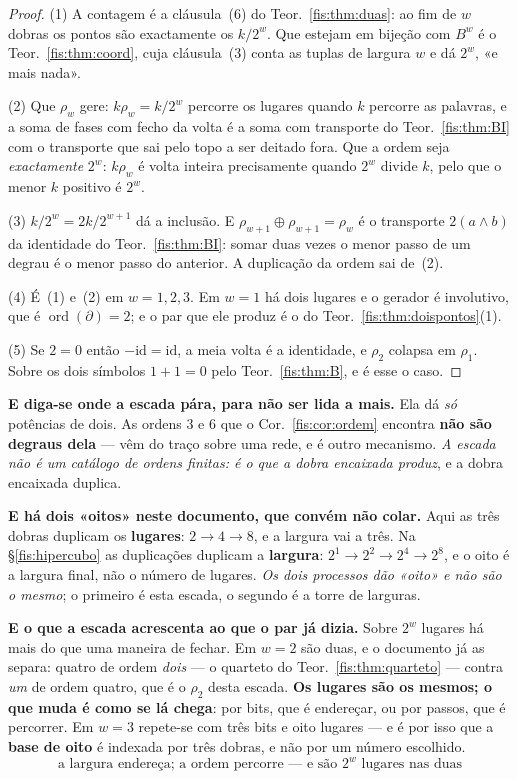 \documentclass[livro.tex]{subfiles}
\begin{document}
\begin{proof}
(1) A contagem é a cláusula~(6) do Teor.~\ref{fis:thm:duas}: ao fim de $w$
dobras os pontos são exactamente os $k/2^{w}$. Que estejam em bijeção com
$B^{w}$ é o Teor.~\ref{fis:thm:coord}, cuja cláusula~(3) conta as tuplas de
largura $w$ e dá $2^{w}$, «e mais nada».

(2) Que $\rho_w$ gere: $k\rho_w=k/2^{w}$ percorre os lugares quando $k$ percorre
as palavras, e a soma de fases com fecho da volta é a soma com transporte do
Teor.~\ref{fis:thm:BI} com o transporte que sai pelo topo a ser deitado fora.
Que a ordem seja \emph{exactamente} $2^{w}$: $k\rho_w$ é volta inteira
precisamente quando $2^{w}$ divide $k$, pelo que o menor $k$ positivo é $2^{w}$.

(3) $k/2^{w}=2k/2^{w+1}$ dá a inclusão. E $\rho_{w+1}\oplus\rho_{w+1}=\rho_w$ é
o transporte $2(a\wedge b)$ da identidade do Teor.~\ref{fis:thm:BI}: somar duas
vezes o menor passo de um degrau é o menor passo do anterior. A duplicação da
ordem sai de~(2).

(4) É~(1) e~(2) em $w=1,2,3$. Em $w=1$ há dois lugares e o gerador é involutivo,
que é $\operatorname{ord}(\partial)=2$; e o par que ele produz é o do
Teor.~\ref{fis:thm:doispontos}(1).

(5) Se $2=0$ então $-\mathrm{id}=\mathrm{id}$, a meia volta é a identidade, e
$\rho_2$ colapsa em $\rho_1$. Sobre os dois símbolos $1+1=0$ pelo
Teor.~\ref{fis:thm:B}, e é esse o caso.
\end{proof}

\medskip\noindent\textbf{E diga-se onde a escada pára, para não ser lida a
mais.} Ela dá \emph{só} potências de dois. As ordens $3$ e $6$ que o
Cor.~\ref{fis:cor:ordem} encontra \textbf{não são degraus dela} --- vêm do traço
sobre uma rede, e é outro mecanismo. \emph{A escada não é um catálogo de ordens
finitas: é o que a dobra encaixada produz}, e a dobra encaixada duplica.

\medskip\noindent\textbf{E há dois «oitos» neste documento, que convém não
colar.} Aqui as três dobras duplicam os \textbf{lugares}: $2\to4\to8$, e a
largura vai a três. Na §\ref{fis:hipercubo} as duplicações duplicam a
\textbf{largura}: $2^{1}\to2^{2}\to2^{4}\to2^{8}$, e o oito é a largura final, não
o número de lugares. \emph{Os dois processos dão «oito» e não são o mesmo}; o
primeiro é esta escada, o segundo é a torre de larguras.

\medskip\noindent\textbf{E o que a escada acrescenta ao que o par já dizia.}
Sobre $2^{w}$ lugares há mais do que uma maneira de fechar. Em $w=2$ são duas, e
o documento já as separa: quatro de ordem \emph{dois} --- o quarteto do
Teor.~\ref{fis:thm:quarteto} --- contra \emph{um} de ordem quatro, que é o
$\rho_2$ desta escada. \textbf{Os lugares são os mesmos; o que muda é como se
lá chega}: por bits, que é endereçar, ou por passos, que é percorrer. Em $w=3$
repete-se com três bits e oito lugares --- e é por isso que a \textbf{base de
oito} é indexada por três dobras, e não por um número escolhido.
\[
\boxed{\;\text{a largura endereça; a ordem percorre --- e são $2^{w}$ lugares nas duas}\;}
\]
\end{document}
